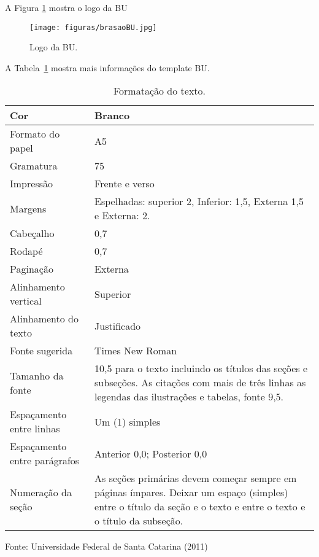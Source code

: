A Figura \ref{fig:a} mostra o logo da BU
\begin{figure}[!htb]
   \centering
   \caption{Logo da BU.}\label{fig:a}
   \texttt{[image: figuras/brasaoBU.jpg]}
\end{figure}

A Tabela~\ref{tab:a} mostra mais informações do template BU.

\begin{table}[!htb]
\begin{center}
    \caption{Formatação do texto.}\label{tab:a}
    \begin{tabular}{ p{3cm} | p{6cm} }
        \hline
        Cor & Branco \\
        \hline
        Formato do papel & A5 \\
        \hline
        Gramatura & 75 \\
        \hline
        Impressão & Frente e verso \\
        \hline
        Margens & Espelhadas: superior 2, Inferior: 1,5, Externa 1,5 e Externa: 2. \\
        \hline
        Cabeçalho & 0,7 \\
        \hline
        Rodapé & 0,7 \\
        \hline
        Paginação & Externa \\
        \hline
        Alinhamento vertical & Superior \\
        \hline
        Alinhamento do texto & Justificado \\
        \hline
        Fonte sugerida & Times New Roman  \\
        \hline
        Tamanho da fonte & 10,5 para o texto
        incluindo os títulos das seções e subseções.
        As citações com mais de três linhas
        as legendas das ilustrações e tabelas, fonte 9,5. \\
        \hline
        Espaçamento entre linhas & Um (1) simples \\
        \hline
        Espaçamento entre parágrafos & Anterior 0,0; Posterior 0,0 \\
        \hline
        Numeração da seção & As seções primárias devem começar
        sempre em páginas ímpares.
        Deixar um espaço (simples) entre o título da seção
        e o texto e entre o texto e o título da subseção. \\
        \hline
    \end{tabular}
\end{center}
Fonte: Universidade Federal de Santa Catarina (2011)
\end{table}


